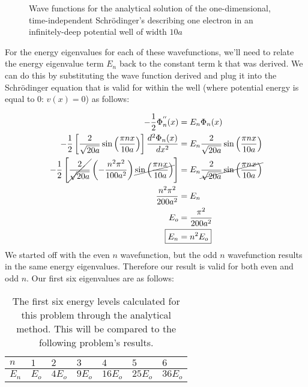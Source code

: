 \documentclass[10pt, oneside, letterpaper]{article}
\begin{document}
\begin{figure}[H]
  \begin{center}
    
  \end{center}
  \caption{Wave functions for the analytical solution of the one-dimensional, time-independent Schr\"{o}dinger's describing one electron in an infinitely-deep potential well of width $10a$}
  \label{analytical-plot}
\end{figure}

For the energy eigenvalues for each of these wavefunctions, we'll need to relate the energy eigenvalue term $E_n$ back to the constant term k that was derived. We can do this by substituting the wave function derived and plug it into the Schr\"{o}dinger equation that is valid for within the well (where potential energy is equal to 0: $v(x) = 0$) as follows:

\begin{align*}
  -\frac{1}{2}\Phi^{''}_n(x) &= {E_n}\Phi_n(x) \\
  -\frac{1}{2}\left[ \frac{2}{\sqrt{20a}}\sin\left(\frac{\pi nx}{10a}\right) \right]\frac{d^2\Phi_n(x)}{dx^2} &= E_n\frac{2}{\sqrt{20a}}\sin\left(\frac{\pi nx}{10a}\right) \\
  -\frac{1}{2}\left[ \cancel{\frac{2}{\sqrt{20a}}} \left(-\frac{n^2\pi^2}{100a^2}\right) \cancel{\sin\left(\frac{\pi nx}{10a}\right)} \right] &= E_n\cancel{ \frac{2}{\sqrt{20a}}\sin\left(\frac{\pi nx}{10a}\right) } \\
  \frac{n^2\pi^2}{200a^2} &= E_n \\
  E_o &= \frac{\pi^2}{200a^2} \\
  \Aboxed{E_n &= n^2E_o & }
\end{align*}
We started off with the even $n$ wavefunction, but the odd $n$ wavefunction results in the same energy eigenvalues. Therefore our result is valid for both even and odd $n$. Our first six eigenvalues are as follows:

\begin{table}
\begin{center}
\begin{tabular}{l|llllll}\hline
$n$    & $1$    & $2$     & $3$     & $4$      & $5$      & $6$      \\\hline
$E_n$  & $E_o$  & $4E_o$  & $9E_o$  & $16E_o$  & $25E_o$  & $36E_o$ \\\hline
\end{tabular}
\end{center}
  \caption{The first six energy levels calculated for this problem through the analytical method. This will be compared to the following problem's results.}
  \label{analytical-energies}
\end{table}
\end{document}
